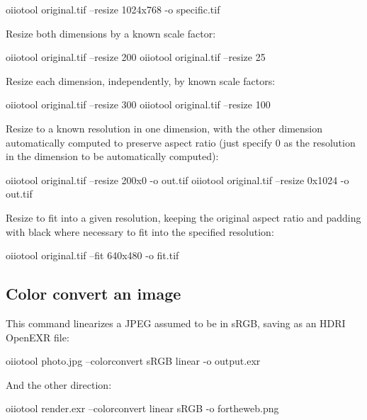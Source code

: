 \begin{code}
    oiiotool original.tif --resize 1024x768 -o specific.tif
\end{code}

\noindent Resize both dimensions by a known scale factor:

\begin{code}
    oiiotool original.tif --resize 200%
    oiiotool original.tif --resize 25%
\end{code}

\noindent Resize each dimension, independently, by known scale factors:

\begin{code}
    oiiotool original.tif --resize 300%
    oiiotool original.tif --resize 100%
\end{code}

\noindent Resize to a known resolution in one dimension, with the other dimension
automatically computed to preserve aspect ratio (just specify 0 as the
resolution in the dimension to be automatically computed):

\begin{code}
    oiiotool original.tif --resize 200x0 -o out.tif
    oiiotool original.tif --resize 0x1024 -o out.tif
\end{code}

\noindent Resize to fit into a given resolution, keeping the original
aspect ratio and padding with black where necessary to fit into the
specified resolution:

\begin{code}
    oiiotool original.tif --fit 640x480 -o fit.tif
\end{code}


\subsection*{Color convert an image}

This command linearizes a JPEG assumed to be in sRGB, saving as
an HDRI OpenEXR file:

\begin{code}
    oiiotool photo.jpg --colorconvert sRGB linear -o output.exr
\end{code}

\noindent And the other direction:

\begin{code}
    oiiotool render.exr --colorconvert linear sRGB -o fortheweb.png
\end{code}

